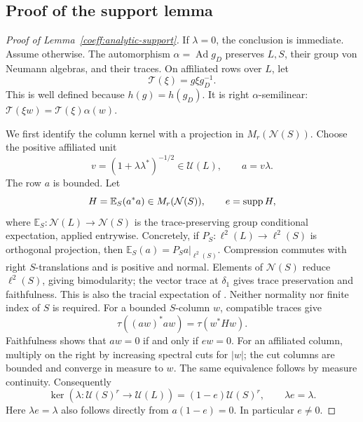 \subsection{Proof of the support lemma}

\begin{proof}[Proof of Lemma~\ref{coeff:analytic-support}]
If \(\lambda=0\), the conclusion is immediate.  Assume otherwise.
The automorphism \(\alpha=\operatorname{Ad}g_D\) preserves \(L,S\),
their group von Neumann algebras, and their traces.  On affiliated
rows over \(L\), let
\[
 \mathcal T(\xi)=g\xi g_D^{-1}.
\]
This is well defined because \(h(g)=h(g_D)\).  It is right
\(\alpha\)-semilinear:
\(\mathcal T(\xi w)=\mathcal T(\xi)\alpha(w)\).

We first identify the column kernel with a projection in
\(M_r(\mathcal N(S))\).  Choose the positive affiliated unit
\[
 v=(1+\lambda\lambda^*)^{-1/2}\in\mathcal U(L),\qquad
 a=v\lambda.
\]
The row \(a\) is bounded.  Let
\[
 H=\mathbb E_S(a^*a)\in M_r(\mathcal N(S)),\qquad e=\operatorname{supp} H,
\]
where \(\mathbb E_S:\mathcal N(L)\to\mathcal N(S)\) is the
trace-preserving group conditional expectation, applied entrywise.
Concretely, if $P_S:\ell^2(L)\to\ell^2(S)$ is orthogonal projection,
then $\mathbb E_S(a)=P_Sa|_{\ell^2(S)}$. Compression commutes with
right $S$-translations and is positive and normal. Elements of
$\mathcal N(S)$ reduce $\ell^2(S)$, giving bimodularity; the vector
trace at $\delta_1$ gives trace preservation and faithfulness.
This is also the tracial expectation of
\cite[Theorem~9.1.2 and Remark~9.1.3]{AnantharamanPopa}.
Neither normality nor finite index of $S$ is required.
For a bounded \(S\)-column \(w\), compatible traces give
\[
 \tau((aw)^*aw)=\tau(w^*Hw).
\]
Faithfulness shows that \(aw=0\) if and only if \(ew=0\).
For an affiliated column, multiply on the right by increasing
spectral cuts for \(|w|\); the cut columns are bounded and converge
in measure to \(w\).  The same equivalence follows by measure
continuity.  Consequently
\begin{equation}\label{coeff:analytic-kernel}
 \ker(\lambda:\mathcal U(S)^r\to\mathcal U(L))
       =(1-e)\mathcal U(S)^r,\qquad \lambda e=\lambda.
\end{equation}
Here \(\lambda e=\lambda\) also follows directly from
\(a(1-e)=0\).  In particular \(e\ne0\).


\end{proof}
